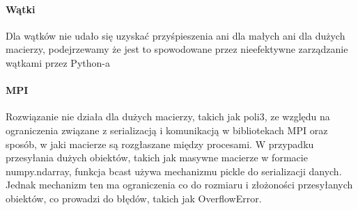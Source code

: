 \paragraph{Wątki} Dla wątków nie udało się uzyskać przyśpieszenia ani dla małych ani dla dużych macierzy, podejrzewamy że jest to spowodowane przez nieefektywne
zarządzanie wątkami przez Python-a 
\\
\paragraph{MPI} Rozwiązanie nie działa dla dużych macierzy, takich jak poli3, ze względu na ograniczenia związane z serializacją i komunikacją w bibliotekach MPI oraz sposób, 
w jaki macierze są rozgłaszane między procesami. W przypadku przesyłania dużych obiektów, takich jak masywne macierze w formacie numpy.ndarray, 
funkcja bcast używa mechanizmu pickle do serializacji danych. Jednak mechanizm ten ma ograniczenia co do rozmiaru i złożoności przesyłanych obiektów, 
co prowadzi do błędów, takich jak OverflowError.

